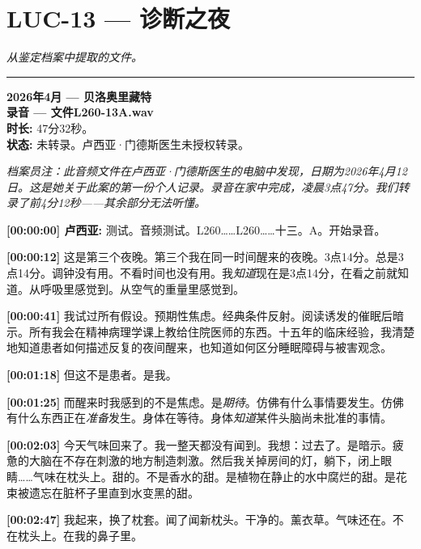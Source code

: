 \section*{\textbf{LUC-13} --- 诊断之夜}

\noindent \textit{从鉴定档案中提取的文件。}

\vspace{0.5em}\noindent\rule{\textwidth}{0.5pt}\vspace{0.5em}


\noindent \textbf{2026年4月 --- 贝洛奥里藏特}\\
\noindent \textbf{录音 --- 文件L260-13A.wav}\\
\noindent \textbf{时长:} 47分32秒。\\
\noindent \textbf{状态:} 未转录。卢西亚·门德斯医生未授权转录。

\noindent \textit{档案员注：此音频文件在卢西亚·门德斯医生的电脑中发现，日期为2026年4月12日。这是她关于此案的第一份个人记录。录音在家中完成，凌晨3点47分。我们转录了前4分12秒——其余部分无法听懂。}

\noindent \textbf{[00:00:00] 卢西亚:} 测试。音频测试。L260……L260……十三。A。开始录音。

\noindent \textbf{[00:00:12]} 这是第三个夜晚。第三个我在同一时间醒来的夜晚。3点14分。总是3点14分。调钟没有用。不看时间也没有用。我\textit{知道}现在是3点14分，在看之前就知道。从呼吸里感觉到。从空气的重量里感觉到。

\noindent \textbf{[00:00:41]} 我试过所有假设。预期性焦虑。经典条件反射。阅读诱发的催眠后暗示。所有我会在精神病理学课上教给住院医师的东西。十五年的临床经验，我清楚地知道患者如何描述反复的夜间醒来，也知道如何区分睡眠障碍与被害观念。

\noindent \textbf{[00:01:18]} 但这不是患者。是我。

\noindent \textbf{[00:01:25]} 而醒来时我感到的不是焦虑。是\textit{期待}。仿佛有什么事情要发生。仿佛有什么东西正在\textit{准备}发生。身体在等待。身体\textit{知道}某件头脑尚未批准的事情。

\noindent \textbf{[00:02:03]} 今天气味回来了。我一整天都没有闻到。我想：过去了。是暗示。疲惫的大脑在不存在刺激的地方制造刺激。然后我关掉房间的灯，躺下，闭上眼睛……气味在枕头上。甜的。不是香水的甜。是植物在静止的水中腐烂的甜。是花束被遗忘在脏杯子里直到水变黑的甜。

\noindent \textbf{[00:02:47]} 我起来，换了枕套。闻了闻新枕头。干净的。薰衣草。气味还在。不在枕头上。在我的鼻子里。

